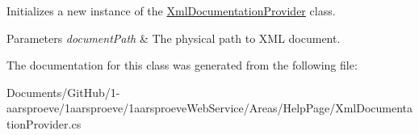 Initializes a new instance of the \hyperlink{class__1aarsproeve_web_service_1_1_areas_1_1_help_page_1_1_xml_documentation_provider}{Xml\+Documentation\+Provider} class. 


\begin{DoxyParams}{Parameters}
{\em document\+Path} & The physical path to X\+M\+L document.\\
\hline
\end{DoxyParams}


The documentation for this class was generated from the following file\+:\begin{DoxyCompactItemize}
\item 
Documents/\+Git\+Hub/1-\/aarsproeve/1aarsproeve/1aarsproeve\+Web\+Service/\+Areas/\+Help\+Page/Xml\+Documentation\+Provider.\+cs\end{DoxyCompactItemize}
